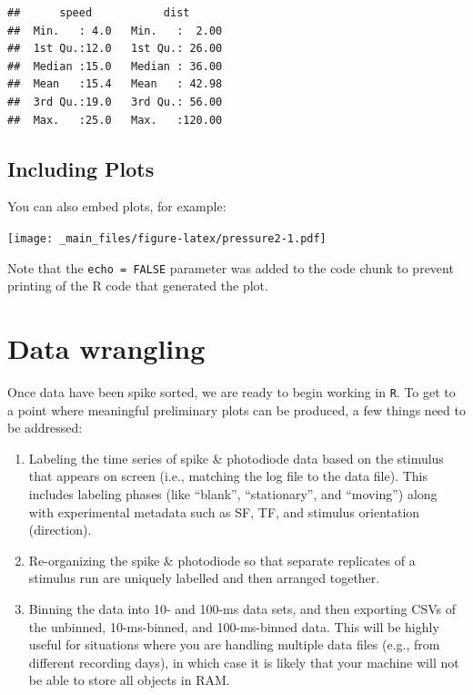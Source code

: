 \documentclass[
]{book}
\begin{document}
\begin{verbatim}
##      speed           dist       
##  Min.   : 4.0   Min.   :  2.00  
##  1st Qu.:12.0   1st Qu.: 26.00  
##  Median :15.0   Median : 36.00  
##  Mean   :15.4   Mean   : 42.98  
##  3rd Qu.:19.0   3rd Qu.: 56.00  
##  Max.   :25.0   Max.   :120.00
\end{verbatim}

\hypertarget{including-plots}{%
\section{Including Plots}\label{including-plots}}

You can also embed plots, for example:

\texttt{[image: \_main\_files/figure-latex/pressure2-1.pdf]}

Note that the \texttt{echo\ =\ FALSE} parameter was added to the code chunk to prevent printing of the R code that generated the plot.

\hypertarget{data-wrangling}{%
\chapter{Data wrangling}\label{data-wrangling}}

Once data have been spike sorted, we are ready to begin working in \texttt{R}. To get
to a point where meaningful preliminary plots can be produced, a few things need
to be addressed:

\begin{enumerate}
\def\labelenumi{\arabic{enumi})}
\item
  Labeling the time series of spike \& photodiode data based on the stimulus
  that appears on screen (i.e., matching the log file to the data file). This
  includes labeling phases (like ``blank'', ``stationary'', and ``moving'') along
  with experimental metadata such as SF, TF, and stimulus orientation
  (direction).
\item
  Re-organizing the spike \& photodiode so that separate replicates of a
  stimulus run are uniquely labelled and then arranged together.
\item
  Binning the data into 10- and 100-ms data sets, and then exporting CSVs of
  the unbinned, 10-ms-binned, and 100-ms-binned data. This will be highly
  useful for situations where you are handling multiple data files (e.g., from
  different recording days), in which case it is likely that your machine will
  not be able to store all objects in RAM.
\end{enumerate}
\end{document}
